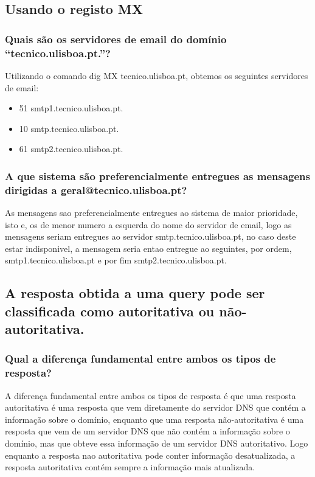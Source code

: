 \subsection{Usando o registo MX}
\subsubsection{Quais são os servidores de email do domínio “tecnico.ulisboa.pt.”?}

Utilizando o comando dig MX tecnico.ulisboa.pt, obtemos os seguintes servidores de email:
\begin{itemize}
    \item 51 smtp1.tecnico.ulisboa.pt.
    \item 10 smtp.tecnico.ulisboa.pt.
    \item 61 smtp2.tecnico.ulisboa.pt.
\end{itemize}

\subsubsection{A que sistema são preferencialmente entregues as mensagens dirigidas a
geral@tecnico.ulisboa.pt?}

As mensagens sao preferencialmente entregues ao sistema de maior prioridade, isto e, os de menor numero a esquerda do nome do servidor de email, logo as mensagens seriam entregues ao servidor smtp.tecnico.ulisboa.pt, no caso deste estar indisponivel, a mensagem seria entao entregue ao seguintes, por ordem, smtp1.tecnico.ulisboa.pt e por fim smtp2.tecnico.ulisboa.pt.

\subsection{A resposta obtida a uma query pode ser classificada como autoritativa ou não-autoritativa.}
\subsubsection{Qual a diferença fundamental entre ambos os tipos de resposta?}

A diferença fundamental entre ambos os tipos de resposta é que uma resposta autoritativa é uma resposta que vem diretamente do servidor DNS que contém a informação sobre o domínio, enquanto que uma resposta não-autoritativa é uma resposta que vem de um servidor DNS que não contém a informação sobre o domínio, mas que obteve essa informação de um servidor DNS autoritativo.
Logo enquanto a resposta nao autoritativa pode conter informação desatualizada, a resposta autoritativa contém sempre a informação mais atualizada.

